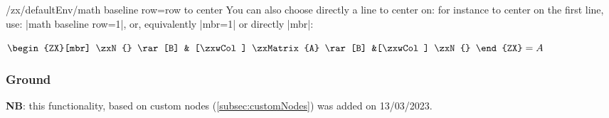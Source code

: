 \documentclass[a4paper,doc2]{ltxdoc} %
\begin{document}
{\begin{stylekey}{/zx/defaultEnv/math baseline row=row to center}
  You can also choose directly a line to center on: for instance to center on the first line, use: |math baseline row=1|, or, equivalently |mbr=1| or directly |mbr|:
\begin{codeexample}[width=0pt]
  $\begin{ZX}[mbr]
    \zxN{} \rar[B] & [\zxwCol] \zxMatrix{A} \rar[B] &[\zxwCol] \zxN{}
  \end{ZX} = A$
\end{codeexample}
\end{stylekey}


\subsubsection{Ground}

\textbf{NB}: this functionality, based on custom nodes (\cref{subsec:customNodes}) was added on 13/03/2023.

}
\end{document}
